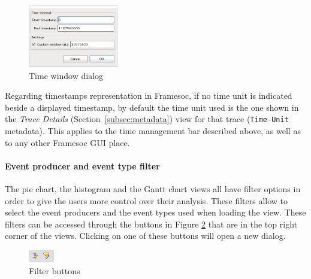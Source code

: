 \documentclass[twoside]{article}
\begin{document}
\begin{sloppypar}
\begin{figure}[h!]
  \centering
    \includegraphics[width=0.35\textwidth]{images/window_dialog.png}
  \caption{Time window dialog}
  \label{fig:window_dialog}
\end{figure}

Regarding timestamps representation in Framesoc, if no time unit is indicated beside a displayed timestamp, 
by default the time unit used is the one shown in the \emph{Trace Details} (Section~\ref{subsec:metadata}) view for that trace (\texttt{Time-Unit} metadata). 
This applies to the time management bar described above, as well as to any other Framesoc GUI place.

\paragraph{Event producer and event type filter}
The pie chart, the histogram and the Gantt chart views all have filter options in order to give the users more control over their analysis.
These filters allow to select the event producers and the event types used when loading the view.  
These filters can be accessed through the buttons in Figure \ref{fig:filterButtons} that are in the top right corner of the views. Clicking on one of these buttons will open a new dialog. 

\begin{figure}[h!]
	\centering
		\includegraphics[width=0.1\textwidth]{images/filterButtons.png}
	\caption{Filter buttons}
	\label{fig:filterButtons}
\end{figure}


\end{sloppypar}
\end{document}

